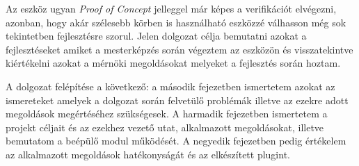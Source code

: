 Az eszköz ugyan \emph{Proof of Concept} jelleggel már képes a verifikációt elvégezni, azonban, hogy akár szélesebb körben is használható eszközzé válhasson még sok tekintetben fejlesztésre szorul. Jelen dolgozat célja bemutatni azokat a fejlesztéseket amiket a mesterképzés során végeztem az eszközön és visszatekintve kiértékelni azokat a mérnöki megoldásokat melyeket a fejlesztés során hoztam.

A dolgozat felépítése a következő: a második fejezetben ismertetem azokat az ismereteket amelyek a dolgozat során felvetülő problémák illetve az ezekre adott megoldások megértéséhez szükségesek. A harmadik fejezetben ismertetem a projekt céljait és az ezekhez vezető utat, alkalmazott megoldásokat, illetve bemutatom a beépülő modul működését. A negyedik fejezetben pedig értékelem az alkalmazott megoldások hatékonyságát és az elkészített plugint.